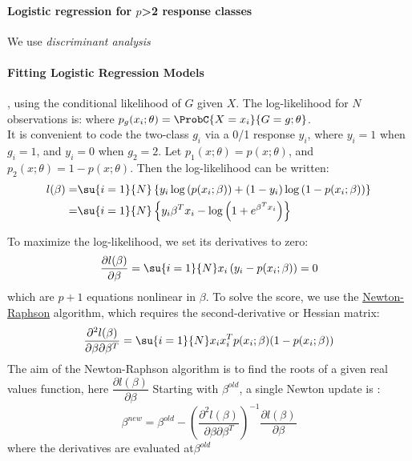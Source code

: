 \paragraph{Logistic regression for $p$>2 response classes}
We use \emph{discriminant analysis}
\paragraph{Fitting Logistic Regression Models}
, using the conditional 
likelihood of $G$ given $X$. The log-likelihood for $N$ observations is: 
 where $p_{g}(x_{i};\theta)=
\ProbC{X=x_{i}}{G=g;\theta}$.\\
It is convenient to code the two-class $g_{i}$ via a 0/1 response $y_{i}$, where $y_{i}=1$ when
$g_{i}=1$, and $y_{i}=0$ when $g_{2}=2$. Let $p_{1}(x;\theta)=p(x;\theta)$, and 
$p_{2}(x;\theta)=1-p(x;\theta)$. Then the log-likelihood can be written:
\begin{align*}
	l(\beta) =& \su{{i=1}}{N}\left\{ y_{i}\log\left(p(x_{i};\beta)\right)+ (1-y_{i})
	\log\left(1- p(x_{i};\beta)\right)\right\}\\
	=& \su{{i=1}}{N}\left\{ y_{i}\beta^{T}x_{i} - \log\left( 1+e^{\beta^{T}x_{i}} \right) \right\}
\end{align*}

To maximize the log-likelihood, we set its derivatives to zero:
$$ \dfrac{\partial l(\beta)}{\partial\beta} = 
\su{{i=1}}{N}x_{i}\left(y_{i}-p(x_{i};\beta)\right)=0$$ which are $p+1$ equations nonlinear in
$\beta$.
To solve the score, we use the \href{https://en.wikipedia.org/wiki/Newton\%27s_method_in_optimization}{Newton-Raphson} algorithm, which requires the second-derivative or 
Hessian matrix:
$$ \dfrac{\partial^{2}l(\beta)}{\partial\beta\partial\beta^{T}}=\su{{i=1}}{N}
x_{i}x_{i}^{T}p(x_{i};\beta)(1-p(x_{i};\beta))$$
The aim of the Newton-Raphson algorithm is to find the roots of a given real values
function, here $\dfrac{\partial l(\beta)}{\partial\beta}$
Starting with $\beta^{old}$, a single Newton update is : $$ \beta^{new} = \beta^{old} - \left(
\dfrac{\partial^{2}l(\beta)}{\partial\beta\partial\beta^{T}} \right)^{-1}\dfrac{\partial l(\beta)}{
\partial\beta}$$ where the derivatives are evaluated at$\beta^{old}$

